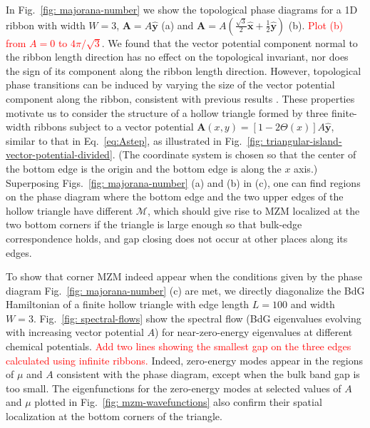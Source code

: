 \documentclass[aps,prb,showpacs,amsmath,twocolumn,amssymb,superscriptaddress]{revtex4-2}
\newcommand{\Red}[1]{\textcolor{red}{#1}}
\let\oldhat\hat
\renewcommand{\hat}[1]{\oldhat{\mathbf{#1}}}
\begin{document}
In Fig.~\ref{fig: majorana-number} we show the topological phase diagrams for a 1D ribbon with width $W=3$, $\bm A = A\hat{y}$ (a) and $\bm A = A(\frac{\sqrt{3}}{2}\hat{x}+\frac{1}{2}\hat{y})$ (b). \Red{Plot (b) from $A=0$ to $4\pi/\sqrt{3}$}. We found that the vector potential component normal to the ribbon length direction has no effect on the topological invariant, nor does the sign of its component along the ribbon length direction. However, topological phase transitions can be induced by varying the size of the vector potential component along the ribbon, consistent with previous results \cite{romitoManipulatingMajoranaFermions2012, takasanSupercurrentinducedTopologicalPhase2022}. These properties motivate us to consider the structure of a hollow triangle formed by three finite-width ribbons subject to a vector potential $\mathbf A(x,y) = \left[1-2\Theta(x)\right]A\hat{y}$, similar to that in Eq.~\eqref{eq:Astep}, as illustrated in Fig.~\ref{fig: triangular-island-vector-potential-divided}. (The coordinate system is chosen so that the center of the bottom edge is the origin and the bottom edge is along the $x$ axis.) Superposing Figs.~\ref{fig: majorana-number} (a) and (b) in (c), one can find regions on the phase diagram where the bottom edge and the two upper edges of the hollow triangle have different $\mathcal{M}$, which should give rise to MZM localized at the two bottom corners if the triangle is large enough so that bulk-edge correspondence holds, and gap closing does not occur at other places along its edges. 

To show that corner MZM indeed appear when the conditions given by the phase diagram Fig.~\ref{fig: majorana-number} (c) are met, we directly diagonalize the BdG Hamiltonian of a finite hollow triangle with edge length $L=100$ and width $W=3$. Fig.~\ref{fig: spectral-flows} show the spectral flow (BdG eigenvalues evolving with increasing vector potential $A$) for near-zero-energy eigenvalues at different chemical potentials. \Red{Add two lines showing the smallest gap on the three edges calculated using infinite ribbons.} Indeed, zero-energy modes appear in the regions of $\mu$ and $A$ consistent with the phase diagram, except when the bulk band gap is too small. The eigenfunctions for the zero-energy modes at selected values of $A$ and $\mu$ plotted in Fig.~\ref{fig: mzm-wavefunctions} also confirm their spatial localization at the bottom corners of the triangle. 
\end{document}
